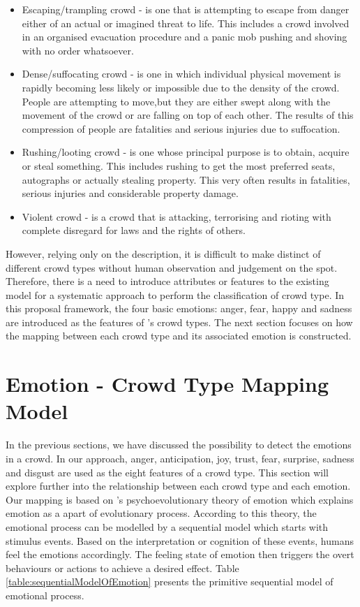 \begin{itemize}
\item Escaping/trampling crowd - is one that is attempting to escape from danger either of an actual or imagined threat to life. This includes a crowd involved in an organised evacuation procedure and a panic mob pushing and shoving with no order whatsoever.
\item Dense/suffocating crowd - is one in which individual physical movement is rapidly becoming less likely or impossible due to the density of the crowd. People are attempting to move,but they are either swept along with the movement of the crowd or are falling on top of each other. The results of this compression of people are fatalities and serious injuries due to suffocation.
\item Rushing/looting crowd - is one whose principal purpose is to obtain, acquire or steal something. This includes rushing to get the most preferred seats, autographs or actually stealing property. This very often results in fatalities, serious injuries and considerable property damage.
\item Violent crowd - is a crowd that is attacking, terrorising and rioting with complete disregard for laws and the rights of others.
\end{itemize}
However, relying only on the description, it is difficult to make distinct of different crowd types without human observation and judgement on the spot. Therefore, there is a need to introduce attributes or features to the existing model for a systematic approach to perform the classification of crowd type. In this proposal framework, the four basic emotions: anger, fear, happy and sadness are introduced as the features of \citet{Berlonghi1995}'s crowd types. The next section focuses on how the mapping between each crowd type and its associated emotion is constructed.

\section{Emotion - Crowd Type Mapping Model}
In the previous sections, we have discussed the possibility to detect the emotions in a crowd. In our approach, anger, anticipation, joy, trust, fear, surprise, sadness and disgust are used as the eight features of a crowd type. This section will explore further into the relationship between each crowd type and each emotion. Our mapping is based on \citet{Plutchik1980}'s psychoevolutionary theory of emotion which explains emotion as a apart of evolutionary process. According to this theory, the emotional process can be modelled by a sequential model which starts with stimulus events. Based on the interpretation or cognition of these events, humans feel the emotions accordingly. The feeling state of emotion then triggers the overt behaviours or actions to achieve a desired effect. Table \ref{table:sequentialModelOfEmotion} presents the primitive sequential model of emotional process.

